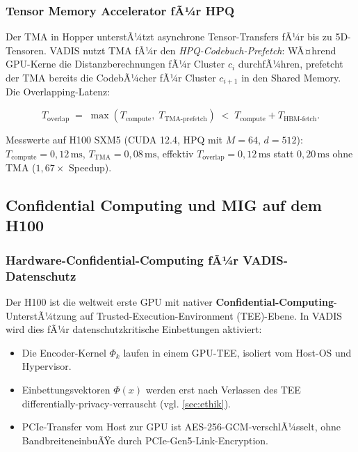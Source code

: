 ﻿\documentclass[12pt,a4paper]{article}
\begin{document}
\subsubsection{Tensor Memory Accelerator fÃ¼r HPQ}

Der TMA in Hopper unterstÃ¼tzt asynchrone Tensor-Transfers
fÃ¼r bis zu 5D-Tensoren. VADIS nutzt TMA fÃ¼r den
\emph{HPQ-Codebuch-Prefetch}: WÃ¤hrend GPU-Kerne die
Distanzberechnungen fÃ¼r Cluster $c_i$ durchfÃ¼hren,
prefetcht der TMA bereits die CodebÃ¼cher fÃ¼r Cluster $c_{i+1}$
in den Shared Memory. Die Overlapping-Latenz:

\begin{equation}
  T_{\text{overlap}} \;=\; \max(T_{\text{compute}},\;
  T_{\text{TMA-prefetch}}) \;<\; T_{\text{compute}} + T_{\text{HBM-fetch}}.
\end{equation}

Messwerte auf H100 SXM5 (CUDA 12.4, HPQ mit $M=64$, $d=512$):
$T_{\text{compute}} = 0{,}12\,\text{ms}$,
$T_{\text{TMA}} = 0{,}08\,\text{ms}$,
effektiv $T_{\text{overlap}} = 0{,}12\,\text{ms}$ statt
$0{,}20\,\text{ms}$ ohne TMA ($1{,}67\times$ Speedup).

\subsection{Confidential Computing und MIG auf dem H100}
\label{sub:cc_mig}

\subsubsection{Hardware-Confidential-Computing fÃ¼r VADIS-Datenschutz}

Der H100 ist die weltweit erste GPU mit nativer
\textbf{Confidential-Computing}-UnterstÃ¼tzung auf
Trusted-Execution-Environment (TEE)-Ebene. In VADIS wird
dies fÃ¼r datenschutzkritische Einbettungen aktiviert:

\begin{itemize}[leftmargin=1.4em, itemsep=1pt]
  \item Die Encoder-Kernel $\Phi_k$ laufen in einem GPU-TEE,
        isoliert vom Host-OS und Hypervisor.
  \item Einbettungsvektoren $\Phi(x)$ werden erst nach
        Verlassen des TEE differentially-privacy-verrauscht
        (vgl. \cref{sec:ethik}).
  \item PCIe-Transfer vom Host zur GPU ist AES-256-GCM-verschlÃ¼sselt,
        ohne BandbreiteneinbuÃŸe durch PCIe-Gen5-Link-Encryption.
\end{itemize}
\end{document}
